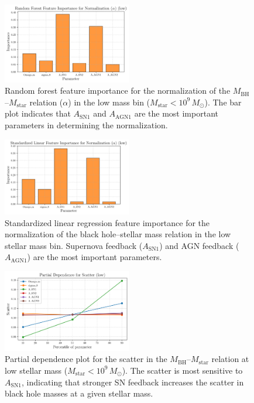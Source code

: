 \documentclass[twocolumn]{aastex631}
\begin{document}
\begin{figure}[ht!]
    \centering
    \includegraphics[width=0.5\textwidth]{plots/featimp_RandomForest_Normalization_alpha_low_30_20250423_182538.png}
    \caption{Random forest feature importance for the normalization of the $M_\mathrm{BH}$--$M_\mathrm{star}$ relation ($\alpha$) in the low mass bin ($M_\mathrm{star}<10^9\,M_\odot$). The bar plot indicates that $A_\mathrm{SN1}$ and $A_\mathrm{AGN1}$ are the most important parameters in determining the normalization.
}
    \label{fig:featimp_norm_low}
\end{figure}

\begin{figure}[ht!]
    \centering
    \includegraphics[width=0.5\textwidth]{plots/featimp_StandardizedLinear_Normalization_alpha_low_31_20250423_182539.png}
    \caption{Standardized linear regression feature importance for the normalization of the black hole--stellar mass relation in the low stellar mass bin. Supernova feedback ($A_\mathrm{SN1}$) and AGN feedback ($A_\mathrm{AGN1}$) are the most important parameters.
}
    \label{fig:featimp_norm_linear_low}
\end{figure}

\begin{figure}[ht!]
    \centering
    \includegraphics[width=0.5\textwidth]{plots/pdp_Scatter_low_35_20250423_182541.png}
    \caption{Partial dependence plot for the scatter in the $M_\mathrm{BH}$--$M_\mathrm{star}$ relation at low stellar mass ($M_\mathrm{star}<10^9\,M_\odot$). The scatter is most sensitive to $A_\mathrm{SN1}$, indicating that stronger SN feedback increases the scatter in black hole masses at a given stellar mass.
}
    \label{fig:pdp_scatter_low}
\end{figure}
\end{document}

